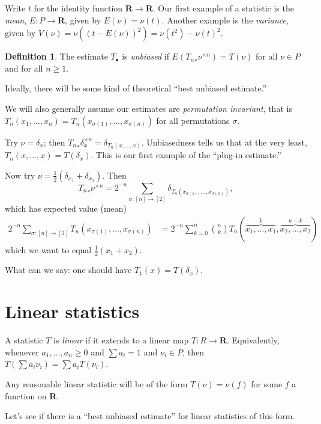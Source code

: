 \documentclass{article}
\newcommand{\bR}{\mathbf{R}}
\theoremstyle{definition}
\newtheorem{definition}{Definition}
\begin{document}
Write $t$ for the identity function $\bR\to \bR$. Our first example of a 
statistic is the \emph{mean}, $E\colon P\to \bR$, given by 
$E(\nu) = \nu(t)$. Another example is the \emph{variance}, given by 
$V(\nu) = \nu((t-E(\nu))^2) = \nu(t^2) - \nu(t)^2$. 

\begin{definition}
The estimate $T_\bullet$ is \emph{unbiased} if 
$E({T_n}_\ast\nu^{\times n}) = T(\nu)$ for all $\nu\in P$ and for all 
$n\geqslant 1$. 
\end{definition}

Ideally, there will be some kind of theoretical ``best unbiased estimate.''

We will also generally assume our estimates are \emph{permutation invariant}, 
that is $T_n(x_1,\dots,x_n) = T_n(x_{\sigma(1)},\dots,x_{\sigma(n)})$ for all 
permutations $\sigma$. 

Try $\nu = \delta_x$; then 
${T_n}_\ast \delta_x^{\times n} = \delta_{T_n(x,\dots,x)}$. Unbiasedness tells 
us that at the very least, $T_n(x,\dots,x) = T(\delta_x)$. This is our first 
example of the ``plug-in estimate.'' 

Now try $\nu = \frac 1 2 (\delta_{x_1} + \delta_{x_2})$. Then 
\[
	{T_n}_\ast \nu^{\times n} 
		= 2^{-n} \sum_{\sigma:[n]\to [2]} \delta_{T_n(x_{\sigma(1)},\dots,x_{\sigma(n)})} ,
\]
which has expected value (mean) 
\begin{align*}
	2^{-n} \sum_{\sigma:[n]\to [2]}T_n(x_{\sigma(1)},\dots,x_{\sigma(n)}) 
		&= 2^{-n}\sum_{k=0}^n \binom n k T_n(\overbrace{x_1,\dots,x_1}^k,\overbrace{x_2,\dots,x_2}^{n-k})
\end{align*}
which we want to equal $\frac 1 2 (x_1 + x_2)$. 

What can we say: one should have $T_1(x) = T(\delta_x)$. 





\section{Linear statistics}

A statistic $T$ is \emph{linear} if it extends to a linear map 
$T\colon R\to \bR$. Equivalently, whenever $a_1,\dots,a_n\geqslant 0$ and 
$\sum a_i = 1$ and $\nu_i\in P$, then $T(\sum a_i \nu_i) = \sum a_i T(\nu_i)$. 

Any reasonable linear statistic will be of the form $T(\nu) = \nu(f)$ for some 
$f$ a function on $\bR$. 

Let's see if there is a ``best unbiased estimate'' for linear statistics of 
this form. 
\end{document}
